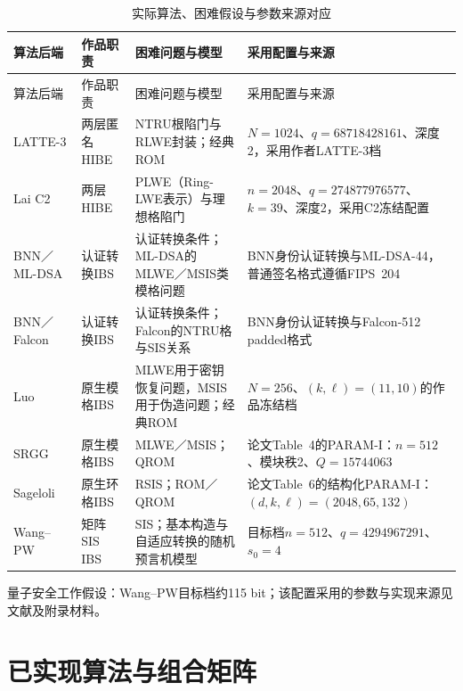\begin{longtable}{@{}>{\raggedright\arraybackslash}p{}>{\raggedright\arraybackslash}p{}>{\raggedright\arraybackslash}p{}>{\raggedright\arraybackslash}p{}@{}}
\caption{实际算法、困难假设与参数来源对应}\label{tab:assumption-source-map}\\
\toprule
\rowcolor{black!8} 算法后端 & 作品职责 & 困难问题与模型 & 采用配置与来源 \\
\midrule
\endfirsthead
\toprule
\rowcolor{black!8} 算法后端 & 作品职责 & 困难问题与模型 & 采用配置与来源 \\
\midrule
\endhead
LATTE-3 & 两层匿名HIBE & NTRU根陷门与RLWE封装；经典ROM & $N=1024$、$q=68718428161$、深度2，采用作者LATTE-3档\cite{zhao2024latte} \\
Lai C2 & 两层HIBE & PLWE（Ring-LWE表示）与理想格陷门 & $n=2048$、$q=274877976577$、$k=39$、深度2，采用C2冻结配置\cite{lai2015trapdoors} \\
BNN／ML-DSA & 认证转换IBS & 认证转换条件；ML-DSA的MLWE／MSIS类模格问题 & BNN身份认证转换与ML-DSA-44，普通签名格式遵循FIPS~204\cite{galindo2006ibs,nist2024fips204} \\
BNN／Falcon & 认证转换IBS & 认证转换条件；Falcon的NTRU格与SIS关系 & BNN身份认证转换与Falcon-512 padded格式\cite{galindo2006ibs,falcon2020} \\
Luo & 原生模格IBS & MLWE用于密钥恢复问题，MSIS用于伪造问题；经典ROM & $N=256$、$(k,\ell)=(11,10)$的作品冻结档\cite{luo2024ibs} \\
SRGG & 原生模格IBS & MLWE／MSIS；QROM & 论文Table~4的PARAM-I：$n=512$、模块秩2、$Q=15744063$\cite{jia2025ibs} \\
Sageloli & 原生环格IBS & RSIS；ROM／QROM & 论文Table~6的结构化PARAM-I：$(d,k,\ell)=(2048,65,132)$\cite{sageloli2023ibs} \\
Wang--PW & 矩阵SIS IBS & SIS；基本构造与自适应转换的随机预言机模型 & 目标档$n=512$、$q=4294967291$、$s_0=4$\cite{wang2024ibme,pan2021ibs} \\
\bottomrule
\end{longtable}
\noindent\begin{minipage}{.98\textwidth}\footnotesize
量子安全工作假设：Wang--PW目标档约115 bit；该配置采用的参数与实现来源见文献及附录材料。
\end{minipage}

\section{已实现算法与组合矩阵}


